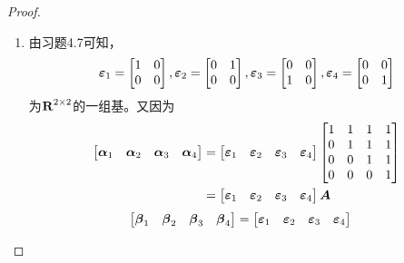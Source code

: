 \begin{proof}
    \begin{enumerate}
        \item {
              由习题4.7可知，
              \begin{equation*}
                  \boldsymbol{\varepsilon}_1=\begin{bmatrix}1&0\\0&0\end{bmatrix},
                  \boldsymbol{\varepsilon}_2=\begin{bmatrix}0&1\\0&0\end{bmatrix},
                  \boldsymbol{\varepsilon}_3=\begin{bmatrix}0&0\\1&0\end{bmatrix},
                  \boldsymbol{\varepsilon}_4=\begin{bmatrix}0&0\\0&1\end{bmatrix}
              \end{equation*}
              为\(\boldsymbol{\mathrm{R}}^{2\times2}\)的一组基。又因为
              \begin{align*}
                  \begin{bmatrix}\boldsymbol{\alpha}_1&\boldsymbol{\alpha}_2&\boldsymbol{\alpha}_3&\boldsymbol{\alpha}_4\end{bmatrix}
                   & =
                  \begin{bmatrix}\boldsymbol{\varepsilon}_1&\boldsymbol{\varepsilon}_2&\boldsymbol{\varepsilon}_3&\boldsymbol{\varepsilon}_4\end{bmatrix}
                  \begin{bmatrix}
                      1 & 1 & 1 & 1 \\
                      0 & 1 & 1 & 1 \\
                      0 & 0 & 1 & 1 \\
                      0 & 0 & 0 & 1
                  \end{bmatrix} \\
                   & =
                  \begin{bmatrix}\boldsymbol{\varepsilon}_1&\boldsymbol{\varepsilon}_2&\boldsymbol{\varepsilon}_3&\boldsymbol{\varepsilon}_4\end{bmatrix}\boldsymbol{A}
              \end{align*}
              \begin{align*}
                  \begin{bmatrix}\vecbeta_1&\vecbeta_2&\vecbeta_3&\vecbeta_4\end{bmatrix}
                   & =
                  \begin{bmatrix}\vecveps_1&\vecveps_2&\vecveps_3&\vecveps_4\end{bmatrix}

\end{align*}}
\end{enumerate}
\end{proof}
